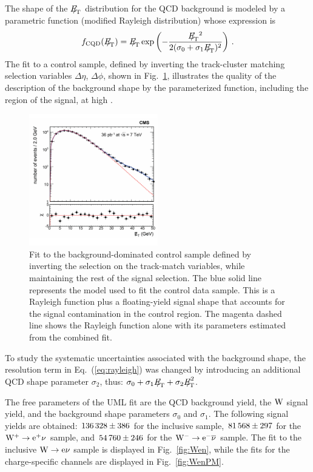 The shape of the ${E\!\!\!/}_{\!\mathrm{T}}$ distribution for the QCD background is modeled by a parametric function (modified Rayleigh
distribution) whose expression is
\begin{equation}
f_{\mathrm{CQD}}(\MET) = \MET\exp\left(-\frac{\MET{^2}}{2(\sigma_0+\sigma_1 \MET)^{2}}\right)\,.
\label{eq:rayleigh}
\end{equation}
The fit to a control sample, defined by inverting the track-cluster matching selection
variables $\Delta\eta$, $\Delta\phi$, shown in Fig.~\ref{fig:e-inverted}, illustrates
the quality of the description of the background shape by the parameterized function,
including the region of the signal, at high \MET.
\begin{figure}[htbp]
\begin{center}
\includegraphics[width=0.50\textwidth]{figs/fixedMCyield_normal_model.pdf}
\caption{Fit to the background-dominated control sample defined by inverting
the selection on the track-match variables,
while maintaining the rest of the signal selection.
The blue solid line represents the model used to fit the control data sample. This is a Rayleigh
function plus a floating-yield signal shape that accounts for the signal contamination in the
control region. The magenta dashed line shows the Rayleigh function alone with its parameters estimated
from the combined fit.
}\label{fig:e-inverted}
\end{center}
\end{figure}
To study the systematic uncertainties associated with the background shape, the resolution term in
Eq.~(\ref{eq:rayleigh}) was changed by introducing an additional QCD shape parameter $\sigma_2$,
thus: $\sigma_0 + \sigma_1 \MET + \sigma_2 \MET^2$.

The free parameters of the UML fit are the QCD background yield,
the $\mathrm{W}$ signal yield, and the background shape
parameters $\sigma_0$ and $\sigma_1$.
The following signal yields are obtained:
$ 136\,328 \pm 386   $ for the inclusive sample, $  81\,568 \pm 297   $ for the $\mathrm{W^+} \rightarrow \mathrm{e}^+\nu$ sample, and
$  54\,760 \pm 246   $ for the $\mathrm{W^-} \rightarrow \mathrm{e}^-\overline{\nu}$ sample.
The fit to the inclusive $\mathrm{W} \rightarrow \mathrm{e}\nu$ sample is displayed
in Fig.~\ref{fig:Wen}, while the fits for the charge-specific
channels are displayed in Fig.~\ref{fig:WenPM}.


